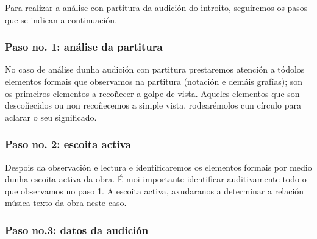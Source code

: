 Para realizar a análise con partitura da audición do introito, seguiremos os pasos que se indican a continuación.
\begin{multicols}{2}
%
\subsubsection*{Paso no. 1: análise da partitura} 

No caso de análise dunha audición con partitura prestaremos atención a tódolos elementos formais que observamos na partitura (notación e demáis grafías); son os primeiros elementos a recoñecer a golpe de vista.
Aqueles elementos que son descoñecidos ou non recoñecemos a simple vista, rodearémolos cun círculo para aclarar o seu significado.

\subsubsection*{Paso no. 2: escoita activa} 

Despois da observación e lectura e identificaremos os elementos formais por medio dunha escoita activa da obra.
É moi importante identificar auditivamente todo o que observamos no paso 1.
A escoita activa, axudaranos a determinar a relación música-texto da obra neste caso.

\subsubsection*{Paso no.3: datos da audición} 


\end{multicols}
